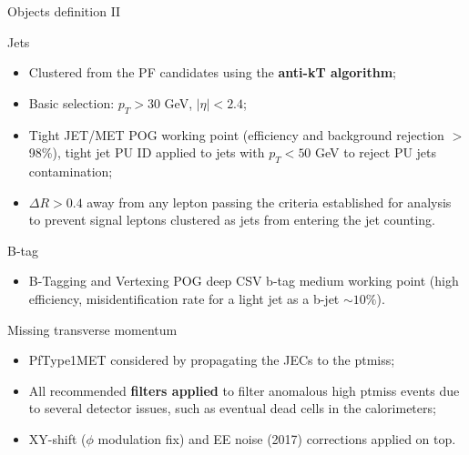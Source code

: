 \documentclass[8pt]{beamer}
\begin{document}
\begin{frame}{Objects definition II}
\justifying
\vspace{5pt} \begin{block}{\centering Jets}\end{block}
\begin{itemize}
\justifying
\item Clustered from the PF candidates using the \textbf{anti-kT algorithm};
\item Basic selection: $p_T > 30$ GeV, $|\eta| < 2.4$;
\item \alert{Tight JET/MET POG} working point (efficiency and background rejection $>$ 98\%), tight jet PU ID applied to jets with $p_T < 50$ GeV to reject PU jets contamination;
\item $\Delta R > 0.4$ away from any lepton passing the criteria established for analysis to prevent signal leptons clustered as jets from entering the jet counting.
\end{itemize} \vfill

\vspace{5pt}
\begin{block}{\centering B-tag}\end{block}
\begin{itemize}
\justifying
\item B-Tagging and Vertexing POG \alert{deep CSV b-tag medium working point} (high efficiency, misidentification rate for a light jet as a b-jet $\sim 10\%$).
\end{itemize} \vfill

\vspace{5pt}
\begin{block}{\centering Missing transverse momentum}\end{block}
\begin{itemize}
\justifying
\item \alert{PfType1MET} considered by propagating the JECs to the ptmiss;
\item All recommended \textbf{filters applied} to filter anomalous high ptmiss events due to several detector issues, such as eventual dead cells in the calorimeters;
\item XY-shift ($\phi$ modulation fix) and EE noise (2017) corrections applied on top.
\end{itemize} \vfill
\end{frame}
\end{document}
